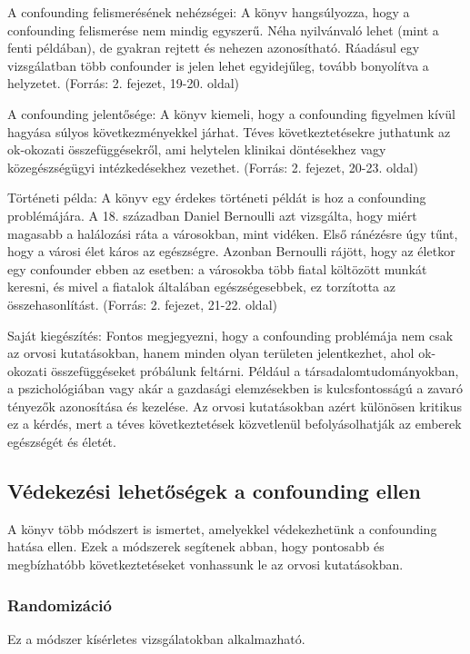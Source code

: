\documentclass[a4paper,12pt]{article}
\begin{document}
A confounding felismerésének nehézségei: A könyv hangsúlyozza, hogy a confounding felismerése nem mindig egyszerű. Néha nyilvánvaló lehet (mint a fenti példában), de gyakran rejtett és nehezen azonosítható. Ráadásul egy vizsgálatban több confounder is jelen lehet egyidejűleg, tovább bonyolítva a helyzetet. (Forrás: 2. fejezet, 19-20. oldal)

A confounding jelentősége: A könyv kiemeli, hogy a confounding figyelmen kívül hagyása súlyos következményekkel járhat. Téves következtetésekre juthatunk az ok-okozati összefüggésekről, ami helytelen klinikai döntésekhez vagy közegészségügyi intézkedésekhez vezethet. (Forrás: 2. fejezet, 20-23. oldal)

Történeti példa: A könyv egy érdekes történeti példát is hoz a confounding problémájára. A 18. században Daniel Bernoulli azt vizsgálta, hogy miért magasabb a halálozási ráta a városokban, mint vidéken. Első ránézésre úgy tűnt, hogy a városi élet káros az egészségre. Azonban Bernoulli rájött, hogy az életkor egy confounder ebben az esetben: a városokba több fiatal költözött munkát keresni, és mivel a fiatalok általában egészségesebbek, ez torzította az összehasonlítást. (Forrás: 2. fejezet, 21-22. oldal)

Saját kiegészítés: Fontos megjegyezni, hogy a confounding problémája nem csak az orvosi kutatásokban, hanem minden olyan területen jelentkezhet, ahol ok-okozati összefüggéseket próbálunk feltárni. Például a társadalomtudományokban, a pszichológiában vagy akár a gazdasági elemzésekben is kulcsfontosságú a zavaró tényezők azonosítása és kezelése. Az orvosi kutatásokban azért különösen kritikus ez a kérdés, mert a téves következtetések közvetlenül befolyásolhatják az emberek egészségét és életét.

\subsection{Védekezési lehetőségek a confounding ellen}

A könyv több módszert is ismertet, amelyekkel védekezhetünk a confounding hatása ellen. Ezek a módszerek segítenek abban, hogy pontosabb és megbízhatóbb következtetéseket vonhassunk le az orvosi kutatásokban.

\subsubsection{Randomizáció}

Ez a módszer kísérletes vizsgálatokban alkalmazható.
\end{document}
